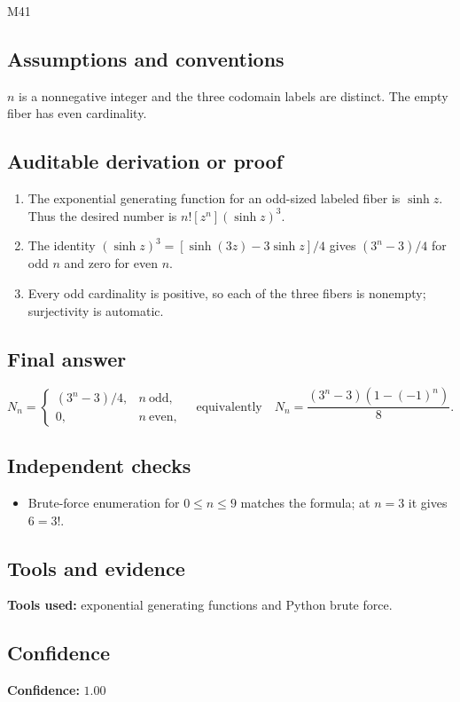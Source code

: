 \documentclass[11pt]{article}
\begin{document}
\begin{mprsolution}{M41}
\subsection*{Assumptions and conventions}
\(n\) is a nonnegative integer and the three codomain labels are distinct.
The empty fiber has even cardinality.
\subsection*{Auditable derivation or proof}
\begin{enumerate}[label=\textbf{Step \arabic*:},leftmargin=*]
\item The exponential generating function for an odd-sized labeled fiber is
\(\sinh z\).  Thus the desired number is \(n![z^n](\sinh z)^3\).
\item The identity
\((\sinh z)^3=[\sinh(3z)-3\sinh z]/4\) gives
\((3^n-3)/4\) for odd \(n\) and zero for even \(n\).
\item Every odd cardinality is positive, so each of the three fibers is
nonempty; surjectivity is automatic.
\end{enumerate}
\subsection*{Final answer}
\[
\boxed{\displaystyle
N_n=\begin{cases}(3^n-3)/4,&n\ \text{odd},\\0,&n\ \text{even},\end{cases}
\quad\text{equivalently}\quad
N_n=\frac{(3^n-3)(1-(-1)^n)}8.}
\]
\subsection*{Independent checks}
\begin{itemize}[leftmargin=*]
\item Brute-force enumeration for \(0\le n\le9\) matches the formula; at
\(n=3\) it gives \(6=3!\).
\end{itemize}
\subsection*{Tools and evidence}
\textbf{Tools used:} exponential generating functions and Python brute force.
\subsection*{Confidence}
\textbf{Confidence:} \(1.00\)
\end{mprsolution}
\end{document}
